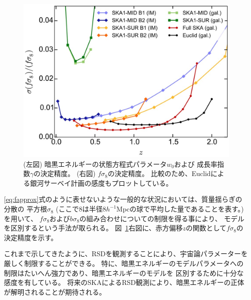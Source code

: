 \begin{description}
\begin{figure}[t]
\begin{minipage}{0.52\hsize}
\begin{center}
 \end{center}
 \end{minipage}
 \begin{minipage}{0.52\hsize}
 \begin{center}
   \includegraphics[width=1.0\linewidth]{cosmology/RSD_fs8.eps} 
 \end{center}
 \end{minipage}
	\caption{(左図) 暗黒エネルギーの状態方程式パラメータ$w_0$および
	成長率指数$\gamma$の決定精度。
	(右図) $f\sigma_8$の決定精度。
	比較のため、Euclidによる銀河サーベイ計画の感度もプロットしている。\citep{Raccanelli:2015qqa}
	}
	\label{fig:RSD fig}
\end{figure}

\eqref{eq:fapprox}式のように表せないような一般的な状況においては、質量揺らぎの分散の
平方根$\sigma_8$ (ここで$8$は半径$8h^{-1}$Mpcの球で平均した量であることを表す。)を用いて、
$f \sigma_8$および$b\sigma_8$の組み合わせについての制限を得る事により、
モデルを区別するという手法が取られる。
図~\ref{fig:RSD fig}右図に、赤方偏移$z$の関数として$f\sigma_8$の決定精度を示す。
\end{description}


これまで示してきたように、RSDを観測することにより、宇宙論パラメーターを厳しく制限することができる。
特に、暗黒エネルギーのモデルパラメータへの制限はたいへん強力であり、暗黒エネルギーのモデルを
区別するために十分な感度を有している。
将来のSKAによるRSD観測により、暗黒エネルギーの正体が解明されることが期待される。


